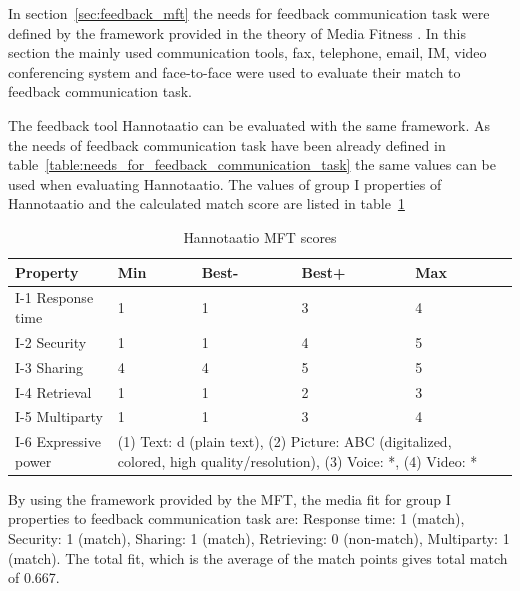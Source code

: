 \documentclass[english,12pt,a4paper,pdftex]{article}
\begin{document}
In section~\ref{sec:feedback_mft} the needs for feedback communication task were defined by the framework provided in the theory of Media Fitness \citep{higa2007}. In this section the mainly used communication tools, fax, telephone, email, \ac{IM}, video conferencing system and face-to-face were used to evaluate their match to feedback communication task.

The feedback tool Hannotaatio can be evaluated with the same framework. As the needs of feedback communication task have been already defined in table~\ref{table:needs_for_feedback_communication_task} the same values can be used when evaluating Hannotaatio. The values of group I properties of Hannotaatio and the calculated match score are listed in table~\ref{table:hannotaatio_mft_scores}

\begin{table}[!h]
\renewcommand{\arraystretch}{1.3}
\caption{Hannotaatio \ac{MFT} scores}
\label{table:hannotaatio_mft_scores}
\centering
\begin{tabular}{|p{3cm}|p{2cm}|p{2cm}|p{2cm}|p{2cm}|p{2cm}|}
\hline
\textbf{Property} & \textbf{Min} & \textbf{Best-} & \textbf{Best+} & \textbf{Max}\\
\hline
I-1 Response time & 1 & 1 & 3 & 4 \\
\hline
I-2 Security & 1 & 1 & 4 & 5 \\
\hline
I-3 Sharing & 4 & 4 & 5 & 5 \\
\hline
I-4 Retrieval & 1 & 1 & 2 & 3 \\
\hline
I-5 Multiparty & 1 & 1 & 3 & 4 \\
\hline
I-6 Expressive power & \multicolumn{4}{|p{10cm}|}{(1) Text: d (plain text), (2) Picture: ABC (digitalized, colored, high quality/resolution), (3) Voice: *, (4) Video: * } \\
\hline
\end{tabular}
\end{table}

By using the framework provided by the \ac{MFT}, the media fit for group I properties to feedback communication task are: Response time: 1 (match), Security: 1 (match), Sharing: 1 (match), Retrieving: 0 (non-match), Multiparty: 1 (match). The total fit, which is the average of the match points gives total match of 0.667.
\end{document}
